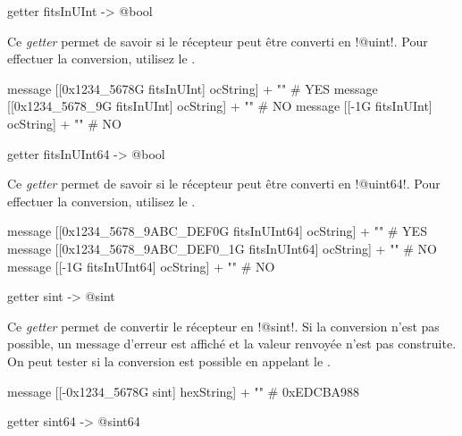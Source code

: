 
\begin{galgasbox}
getter fitsInUInt -> @bool
\end{galgasbox}

Ce \emph{getter} permet de savoir si le récepteur peut être converti en \ggs!@uint!. Pour effectuer la conversion, utilisez le .

\begin{galgas}
message [[0x1234_5678G fitsInUInt] ocString] + "\n" # YES
message [[0x1234_5678_9G fitsInUInt] ocString] + "\n" # NO
message [[-1G fitsInUInt] ocString] + "\n" # NO
\end{galgas}







\begin{galgasbox}
getter fitsInUInt64 -> @bool
\end{galgasbox}

Ce \emph{getter} permet de savoir si le récepteur peut être converti en \ggs!@uint64!. Pour effectuer la conversion, utilisez le .

\begin{galgas}
message [[0x1234_5678_9ABC_DEF0G fitsInUInt64] ocString] + "\n" # YES
message [[0x1234_5678_9ABC_DEF0_1G fitsInUInt64] ocString] + "\n" # NO
message [[-1G fitsInUInt64] ocString] + "\n" # NO
\end{galgas}



\begin{galgasbox}
getter sint -> @sint
\end{galgasbox}

Ce \emph{getter} permet de convertir le récepteur en \ggs!@sint!. Si la conversion n'est pas possible, un message d'erreur est affiché et la valeur renvoyée n'est pas construite. On peut tester si la conversion est possible en appelant le .

\begin{galgas}
message [[-0x1234_5678G sint] hexString] + "\n" # 0xEDCBA988
\end{galgas}





\begin{galgasbox}
getter sint64 -> @sint64
\end{galgasbox}

